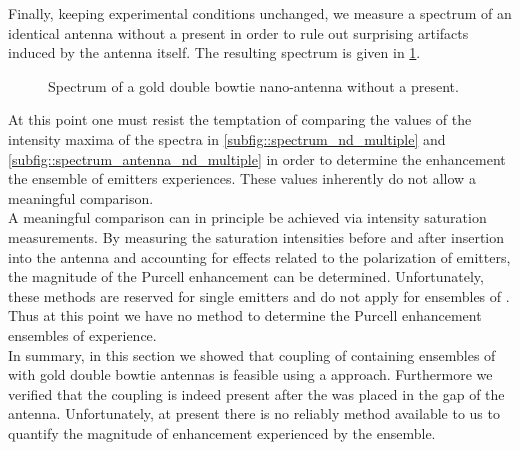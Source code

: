 			Finally, keeping experimental conditions unchanged, we measure a spectrum of an identical antenna without a \nd present in order to rule out surprising artifacts induced by the antenna itself. The resulting spectrum is given in \cref{fig::spectrum_antenna_no_nd}.

				\begin{figure}[htp]
					\centering
					\caption[Spectrum of a double bowtie antenna without \nd]{Spectrum of a gold double bowtie nano-antenna without a \nd present.}
					\label{fig::spectrum_antenna_no_nd}
				\end{figure}

			At this point one must resist the temptation of comparing the values of the intensity maxima of the spectra in \cref{subfig::spectrum_nd_multiple} and \cref{subfig::spectrum_antenna_nd_multiple} in order to determine the enhancement the ensemble of emitters experiences. These values inherently do not allow a meaningful comparison.
			\\
			A meaningful comparison can in principle be achieved via intensity saturation measurements. By measuring the saturation intensities before and after insertion into the antenna and accounting for effects related to the polarization of emitters, the magnitude of the Purcell enhancement can be determined. Unfortunately, these methods are reserved for single emitters and do not apply for ensembles of \sivs. Thus at this point we have no method to determine the Purcell enhancement ensembles of \sivs experience.
			\\
			In summary, in this section we showed that coupling of \nds containing ensembles of \sivs with gold double bowtie antennas is feasible using a \pp approach. Furthermore we verified that the coupling is indeed present after the \nd was placed in the gap of the antenna. Unfortunately, at present there is no reliably method available to us to quantify the magnitude of \fl enhancement experienced by the \siv ensemble.

